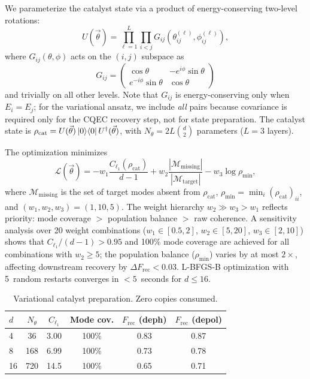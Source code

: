 \documentclass[a4paper,twocolumn]{quantumarticle}
\newenvironment{ruledtabular}{}{}%
\providecommand{\colrule}{\hline}
\begin{document}
We parameterize the catalyst state via a product of energy-conserving two-level rotations:
\begin{equation}
U(\vec\theta) = \prod_{\ell=1}^{L} \prod_{i < j} G_{ij}(\theta_{ij}^{(\ell)}, \phi_{ij}^{(\ell)}),
\label{eq:ansatz}
\end{equation}
where $G_{ij}(\theta, \phi)$ acts on the $(i, j)$ subspace as
\begin{equation}
G_{ij} = \begin{pmatrix} \cos\theta & -e^{i\phi}\sin\theta \\ e^{-i\phi}\sin\theta & \cos\theta \end{pmatrix}
\label{eq:ec_rotation}
\end{equation}
and trivially on all other levels.
Note that $G_{ij}$ is energy-conserving only when $E_i = E_j$; for the variational ansatz, we include \emph{all} pairs because covariance is required only for the CQEC recovery step, not for state preparation.
The catalyst state is $\rho_\mathrm{cat} = U(\vec\theta)\ket{0}\!\bra{0}U^\dagger(\vec\theta)$, with $N_\theta = 2L\binom{d}{2}$ parameters ($L = 3$ layers).

The optimization minimizes
\begin{equation}
\mathcal{L}(\vec\theta) = -w_1 \frac{C_{\ell_1}(\rho_\mathrm{cat})}{d-1} + w_2 \frac{|\mathcal{M}_\mathrm{missing}|}{|\mathcal{M}_\mathrm{target}|} - w_3 \log \rho_\mathrm{min},
\label{eq:var_cost}
\end{equation}
where $\mathcal{M}_\mathrm{missing}$ is the set of target modes absent from $\rho_\mathrm{cat}$, $\rho_\mathrm{min} = \min_i (\rho_\mathrm{cat})_{ii}$, and $(w_1, w_2, w_3) = (1, 10, 5)$.
The weight hierarchy $w_2 \gg w_3 > w_1$ reflects priority: mode coverage $>$ population balance $>$ raw coherence.
A sensitivity analysis over 20 weight combinations ($w_1 \in [0.5, 2]$, $w_2 \in [5, 20]$, $w_3 \in [2, 10]$) shows that $C_{\ell_1}/(d-1) > 0.95$ and 100\% mode coverage are achieved for all combinations with $w_2 \geq 5$; the population balance ($\rho_\mathrm{min}$) varies by at most $2\times$, affecting downstream recovery by $\Delta F_\mathrm{rec} < 0.03$.
L-BFGS-B optimization with 5~random restarts converges in $<5$~seconds for $d \leq 16$.

\begin{table}[tb]
\caption{Variational catalyst preparation. Zero copies consumed.}
\label{tab:variational}
\centering\footnotesize
\setlength{\tabcolsep}{3pt}
\begin{ruledtabular}
\begin{tabular}{lccccc}
$d$ & $N_\theta$ & $C_{\ell_1}$ & Mode cov. & $F_\mathrm{rec}$ (deph) & $F_\mathrm{rec}$ (depol) \\
\colrule
4 & 36 & 3.00 & 100\% & 0.83 & 0.87 \\
8 & 168 & 6.99 & 100\% & 0.73 & 0.78 \\
16 & 720 & 14.5 & 100\% & 0.65 & 0.71 \\
\end{tabular}
\end{ruledtabular}
\end{table}
\end{document}
